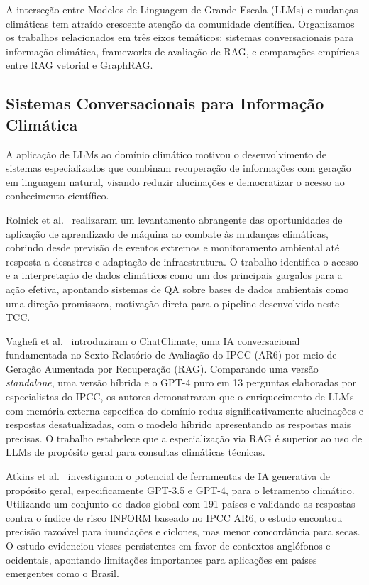 \documentclass[conference]{IEEEtran}
\begin{document}
A interseção entre Modelos de Linguagem de Grande Escala (LLMs)
e mudanças climáticas tem atraído crescente atenção da comunidade
científica.
Organizamos os trabalhos relacionados em três eixos temáticos:
sistemas conversacionais para informação climática, frameworks de
avaliação de RAG, e comparações empíricas entre RAG vetorial e
GraphRAG.

\subsection{Sistemas Conversacionais para Informação Climática}

A aplicação de LLMs ao domínio climático motivou o desenvolvimento
de sistemas especializados que combinam recuperação de informações
com geração em linguagem natural, visando reduzir alucinações e
democratizar o acesso ao conhecimento científico.

Rolnick et al.~\cite{rolnick2022tackling} realizaram um levantamento
abrangente das oportunidades de aplicação de aprendizado de máquina
ao combate às mudanças climáticas, cobrindo desde previsão de
eventos extremos e monitoramento ambiental até resposta a desastres
e adaptação de infraestrutura.
O trabalho identifica o acesso e a interpretação de dados climáticos
como um dos principais gargalos para a ação efetiva, apontando
sistemas de QA sobre bases de dados ambientais como uma direção
promissora, motivação direta para o pipeline desenvolvido neste TCC.

Vaghefi et al.~\cite{vaghefi2023chatclimate} introduziram o
ChatClimate, uma IA conversacional fundamentada no Sexto Relatório
de Avaliação do IPCC (AR6) por meio de Geração Aumentada por
Recuperação (RAG).
Comparando uma versão \textit{standalone}, uma versão híbrida e o
GPT-4 puro em 13 perguntas elaboradas por especialistas do IPCC,
os autores demonstraram que o enriquecimento de LLMs com memória
externa específica do domínio reduz significativamente alucinações
e respostas desatualizadas, com o modelo híbrido apresentando as
respostas mais precisas.
O trabalho estabelece que a especialização via RAG é superior ao
uso de LLMs de propósito geral para consultas climáticas técnicas.

Atkins et al.~\cite{atkins2024generative} investigaram o potencial
de ferramentas de IA generativa de propósito geral, especificamente
GPT-3.5 e GPT-4, para o letramento climático.
Utilizando um conjunto de dados global com 191 países e validando
as respostas contra o índice de risco INFORM baseado no IPCC AR6,
o estudo encontrou precisão razoável para inundações e ciclones,
mas menor concordância para secas.
O estudo evidenciou vieses persistentes em favor de contextos
anglófonos e ocidentais, apontando limitações importantes para
aplicações em países emergentes como o Brasil.
\end{document}

